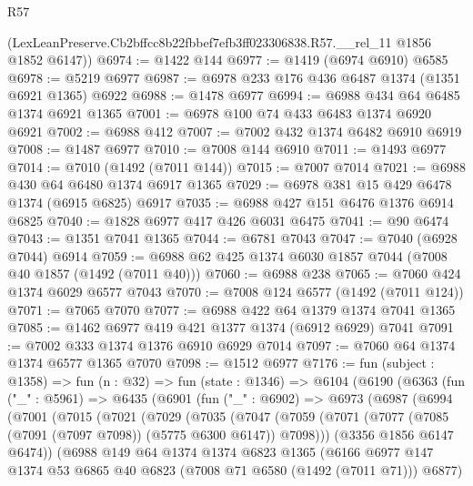 \begin{lexlean}{R57}
\begin{coremodule}
      (LexLeanPreserve.Cb2bffcc8b22fbbef7efb3ff023306838.R57.__rel_11 @1856 @1852 @6147))
@6974 := @1422 @144
@6977 := @1419 (@6974 @6910) @6585
@6978 := @5219 @6977
@6987 := @6978 @233 @176 @436 @6487 @1374 (@1351 @6921 @1365) @6922
@6988 := @1478 @6977
@6994 := @6988 @434 @64 @6485 @1374 @6921 @1365
@7001 := @6978 @100 @74 @433 @6483 @1374 @6920 @6921
@7002 := @6988 @412
@7007 := @7002 @432 @1374 @6482 @6910 @6919
@7008 := @1487 @6977
@7010 := @7008 @144 @6910
@7011 := @1493 @6977
@7014 := @7010 (@1492 (@7011 @144))
@7015 := @7007 @7014
@7021 := @6988 @430 @64 @6480 @1374 @6917 @1365
@7029 := @6978 @381 @15 @429 @6478 @1374 (@6915 @6825) @6917
@7035 := @6988 @427 @151 @6476 @1376 @6914 @6825
@7040 := @1828 @6977 @417 @426 @6031 @6475
@7041 := @90 @6474
@7043 := @1351 @7041 @1365
@7044 := @6781 @7043
@7047 := @7040 (@6928 @7044) @6914
@7059 := @6988 @62 @425 @1374 @6030 @1857 @7044 (@7008 @40 @1857 (@1492 (@7011 @40)))
@7060 := @6988 @238
@7065 := @7060 @424 @1374 @6029 @6577 @7043
@7070 := @7008 @124 @6577 (@1492 (@7011 @124))
@7071 := @7065 @7070
@7077 := @6988 @422 @64 @1379 @1374 @7041 @1365
@7085 := @1462 @6977 @419 @421 @1377 @1374 (@6912 @6929) @7041
@7091 := @7002 @333 @1374 @1376 @6910 @6929 @7014
@7097 := @7060 @64 @1374 @1374 @6577 @1365 @7070
@7098 := @1512 @6977
@7176 := fun (subject : @1358) =>
  fun (n : @32) =>
  fun (state : @1346) =>
  @6104
    (@6190
      (@6363
        (fun ("_" : @5961) =>
        @6435
          (@6901
            (fun ("_" : @6902) =>
            @6973
              (@6987
                (@6994
                  (@7001
                    (@7015
                      (@7021
                        (@7029
                          (@7035
                            (@7047
                              (@7059
                                (@7071
                                  (@7077 (@7085 (@7091 (@7097 @7098)) (@5775 @6300 @6147)) @7098)))
                              (@3356 @1856 @6147 @6474))
                            (@6988
                              @149
                              @64
                              @1374
                              @1374
                              @6823
                              @1365
                              (@6166
                                @6977
                                @147
                                @1374
                                @53
                                @6865
                                @40
                                @6823
                                (@7008 @71 @6580 (@1492 (@7011 @71)))
                                @6877)

\end{coremodule}
\end{lexlean}

